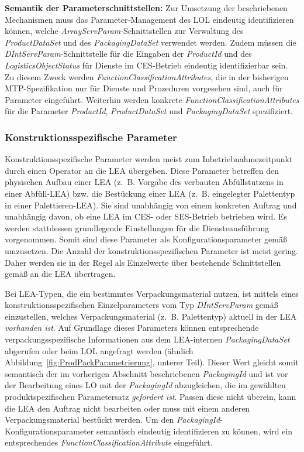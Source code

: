 \pagebreak
 
\textbf{Semantik der Parameterschnittstellen:} Zur Umsetzung der beschriebenen Mechanismen muss das Parameter-Management des LOL eindeutig identifizieren können, welche \emph{ArrayServParam}-Schnittstellen zur Verwaltung des \emph{ProductDataSet} und des \emph{PackagingDataSet} verwendet werden. Zudem müssen die \emph{DIntServParam}-Schnittstelle für die Eingaben der \emph{ProductId} und des \emph{LogisticsObjectStatus} für Dienste im CES-Betrieb eindeutig identifizierbar sein. Zu diesem Zweck werden \emph{FunctionClassificationAttributes}, die in der bisherigen MTP-Spezifikation nur für Dienste und Prozeduren vorgesehen sind, auch für Parameter eingeführt. Weiterhin werden konkrete \emph{FunctionClassificationAttributes} für die Parameter \emph{ProductId}, \emph{ProductDataSet} und \emph{PackagingDataSet} spezifiziert. 

\subsubsection{Konstruktionsspezifische Parameter}

Konstruktionsspezifische Parameter werden meist zum Inbetriebnahmezeitpunkt durch einen Operator an die LEA übergeben. Diese Parameter betreffen den physischen Aufbau einer LEA (z.~B. Vorgabe des verbauten Abfüllstutzens in einer Abfüll-LEA) bzw. die Bestückung einer LEA (z.~B. eingelegter Palettentyp in einer Palettieren-LEA). Sie sind unabhängig von einem konkreten Auftrag und unabhängig davon, ob eine LEA im CES- oder SES-Betrieb betrieben wird. Es werden stattdessen grundlegende Einstellungen für die Diensteausführung vorgenommen. Somit sind diese Parameter als Konfigurationsparameter gemäß \cite{PNO.2025.Part4} umzusetzen. Die Anzahl der konstruktionsspezifischen Parameter ist meist gering. Daher werden sie in der Regel als Einzelwerte über bestehende Schnittstellen gemäß \cite{PNO.2025.Part4} an die LEA übertragen.

Bei LEA-Typen, die ein bestimmtes Verpackungsmaterial nutzen, ist mittels eines konstruktionsspezifischen Einzelparameters vom Typ \emph{DIntServParam} gemäß \cite{PNO.2025.Part4} einzustellen, welches Verpackungsmaterial (z.~B. Palettentyp) aktuell in der LEA \emph{vorhanden ist}. Auf Grundlage dieses Parameters können entsprechende verpackungsspezifische Informationen aus dem LEA-internen \emph{PackagingDataSet} abgerufen oder beim LOL angefragt werden (ähnlich Abbildung~\ref{fig:ProdPackParametrierung}, unterer Teil). Dieser Wert gleicht somit semantisch der im vorherigen Abschnitt beschriebenen \emph{PackagingId} und ist vor der Bearbeitung eines LO mit der \emph{PackagingId} abzugleichen, die im gewählten produktspezifischen Parametersatz \emph{gefordert ist}. Passen diese nicht überein, kann die LEA den Auftrag nicht bearbeiten oder muss mit einem anderen Verpackungsmaterial bestückt werden. Um den \emph{Packaging\-Id}-Konfigurationsparameter semantisch eindeutig identifizieren zu können, wird ein entsprechendes \emph{FunctionClassificationAttribute} eingeführt. 

